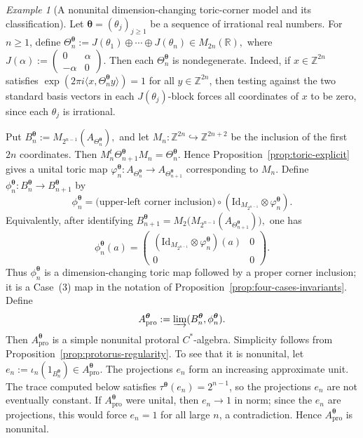 \documentclass[11pt]{amsart}
\theoremstyle{definition}
\theoremstyle{remark}
\newtheorem{example}[theorem]{Example}
\newcommand{\Z}{\mathbb{Z}}
\newcommand{\R}{\mathbb{R}}
\newcommand{\id}{\mathrm{Id}}
\newcommand{\ex}{\mathrm{pro}}
\begin{document}
\begin{example}[A nonunital dimension-changing toric-corner model and its classification]
\label{ex:dimension-changing}
Let $\boldsymbol\theta=(\theta_j)_{j\geq1}$
be a sequence of irrational real numbers. 
For $n\geq1$, define $\Theta_n^{\boldsymbol\theta}:=J(\theta_1)\oplus\cdots\oplus J(\theta_n)
\in M_{2n}(\R), $ where $J(\alpha):=
\begin{pmatrix}
0&\alpha\\
-\alpha&0
\end{pmatrix}.$
Then each \(\Theta_n^{\boldsymbol\theta}\) is nondegenerate. Indeed, if $x\in\Z^{2n}$ satisfies $\exp(2\pi i\langle x,\Theta_n^{\boldsymbol\theta}y\rangle)=1$ for all $y\in\Z^{2n}$,
then testing against the two standard basis vectors in each $J(\theta_j)$-block
forces all coordinates of $x$ to be zero, since each $\theta_j$ is
irrational.

Put $B_n^{\boldsymbol\theta}:=M_{2^{n-1}}(A_{\Theta_n^{\boldsymbol\theta}}),$
and let $M_n\colon \Z^{2n}\hookrightarrow \Z^{2n+2}$
be the inclusion of the first $2n$ coordinates. Then
$M_n^t\Theta_{n+1}^{\boldsymbol\theta}M_n=\Theta_n^{\boldsymbol\theta}.$
Hence Proposition~\ref{prop:toric-explicit} gives a unital toric map $\varphi_n^{\boldsymbol\theta}\colon
A_{\Theta_n^{\boldsymbol\theta}}
\longrightarrow
A_{\Theta_{n+1}^{\boldsymbol\theta}}$
corresponding to $M_n$. Define $\phi_n^{\boldsymbol\theta}
\colon B_n^{\boldsymbol\theta}
\longrightarrow
B_{n+1}^{\boldsymbol\theta}$
by
\[
\phi_n^{\boldsymbol\theta}
=
\bigl(\text{upper-left corner inclusion}\bigr)
\circ
(\id_{M_{2^{n-1}}}\otimes \varphi_n^{\boldsymbol\theta}).
\]
Equivalently, after identifying $B_{n+1}^{\boldsymbol\theta}=M_2\bigl(M_{2^{n-1}}(A_{\Theta_{n+1}^{\boldsymbol\theta}})\bigr),$
one has
\[
\phi_n^{\boldsymbol\theta}(a)
=
\begin{pmatrix}
(\id_{M_{2^{n-1}}}\otimes\varphi_n^{\boldsymbol\theta})(a)&0\\
0&0
\end{pmatrix}.
\]
Thus $\phi_n^{\boldsymbol\theta}$ is a dimension-changing toric map followed
by a proper corner inclusion; it is a Case~\textup{(3)} map in the notation of
Proposition~\ref{prop:four-cases-invariants}. Define
\[
A_{\ex}^{\boldsymbol\theta}
:=
\varinjlim(B_n^{\boldsymbol\theta},\phi_n^{\boldsymbol\theta}).
\]
Then $A_{\ex}^{\boldsymbol\theta}$ is a simple nonunital protoral
$C^*$-algebra. Simplicity follows from
Proposition~\ref{prop:protorus-regularity}. To see that it is nonunital, let $e_n:=\iota_n(1_{B_n^{\boldsymbol\theta}})
\in A_{\ex}^{\boldsymbol\theta}.$ The projections $e_n$ form an increasing approximate unit. The trace computed
below satisfies $\tau^{\boldsymbol\theta}(e_n)=2^{n-1}$, so the projections
$e_n$ are not eventually constant. If $A_{\ex}^{\boldsymbol\theta}$ were
unital, then $e_n\to 1$ in norm; since the $e_n$ are projections, this
would force $e_n=1$ for all large $n$, a contradiction. Hence
$A_{\ex}^{\boldsymbol\theta}$ is nonunital.


\end{example}
\end{document}
